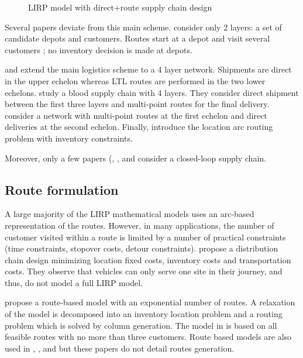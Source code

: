 \documentclass[a4paper,10pt]{article}
\begin{document}
\begin{linenumbers}
\begin{figure}[htbp]
	\centering
	\caption{LIRP model with direct+route supply chain design}
		\label{fig:directloop}
	\end{figure}

Several papers deviate from this main scheme.  \cite{Zhang2014} consider only 2 layers: a set of candidate depots and customers. Routes start at a depot and visit several customers ; no inventory decision is made at depots. 

\cite{AmbScu05} and \cite{Tavana2018} extend the main logistics scheme to a 4 layer network. Shipments are direct in the upper echelon whereas LTL routes are performed in the two lower echelons. 
\cite{Eskandari2018} study a blood supply chain with 4 layers. They consider direct shipment between the first three layers and multi-point routes for the final delivery. 
\cite{Bashiri2018} consider a network with multi-point routes at the first echelon and direct deliveries at the second echelon. 
Finally, \cite{Riquelme2016} introduce the location arc routing problem with inventory constraints. 

Moreover, only a few papers (\cite{LiuChenLiLiu2015}, \cite{Deng2016}, \cite{Zhalechian2016} and \cite{LiGuoWangFu2013} 
consider a closed-loop supply chain. 


\subsection{Route formulation}
\label{sec:r}

A large majority of the LIRP mathematical models uses an arc-based representation of the routes. 
However, in many applications, the number of customer visited within a route is limited by a number of practical constraints (time constraints, stopover costs, detour constraints). \cite{MaDav05} propose a distribution chain design  minimizing location fixed costs, inventory costs and transportation costs. They observe that vehicles can only serve one site in their journey, and thus, do not model a full LIRP model. 

\cite{Guerrero2013} propose a route-based model with an exponential number of routes. A relaxation of the model is decomposed into an inventory location problem and a routing problem which is solved by column generation. 
The model in \cite{Lehrlaly2016} is based on all feasible routes with no more than three customers. 
Route based models are also used in \cite{LiGuoWangFu2013}, \cite{LiuChenLiLiu2015},  \cite{Deng2016} and \cite{hiassat_genetic_2017} 
but these papers do not detail routes generation.


\end{linenumbers}
\end{document}
